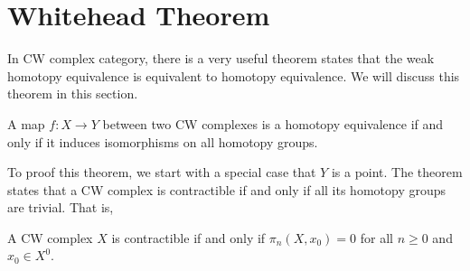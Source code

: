 \section{Whitehead Theorem}
    In CW complex category, there is a very useful theorem states 
    that the weak homotopy equivalence is equivalent to homotopy equivalence. 
    We will discuss this theorem in this section.

    \begin{theorem}{\label{thm:Whitehead-theorem}}
        A map $f:X\to Y$ between two CW complexes is a homotopy equivalence 
        if and only if it induces isomorphisms on all homotopy groups.
    \end{theorem}

    To proof this theorem, we start with a special case that $Y$ is a 
    point. The theorem states that a CW complex is contractible if and only 
    if all its homotopy groups are trivial. That is, 

    \begin{theorem}{\label{thm:Whitehead-theorem-point}}
        A CW complex $X$ is contractible if and only if 
        $\pi_n(X,x_0) = 0$ for all $n\geq 0$ and $x_0\in X^0$.
    \end{theorem}

